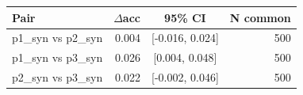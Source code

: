 \begin{tabular}{lrcr}
\toprule
Pair & $\Delta$acc & 95\% CI & N common \\
\midrule
p1_syn vs p2_syn & 0.004 & [-0.016, 0.024] & 500 \\
p1_syn vs p3_syn & 0.026 & [0.004, 0.048] & 500 \\
p2_syn vs p3_syn & 0.022 & [-0.002, 0.046] & 500 \\
\bottomrule
\end{tabular}
